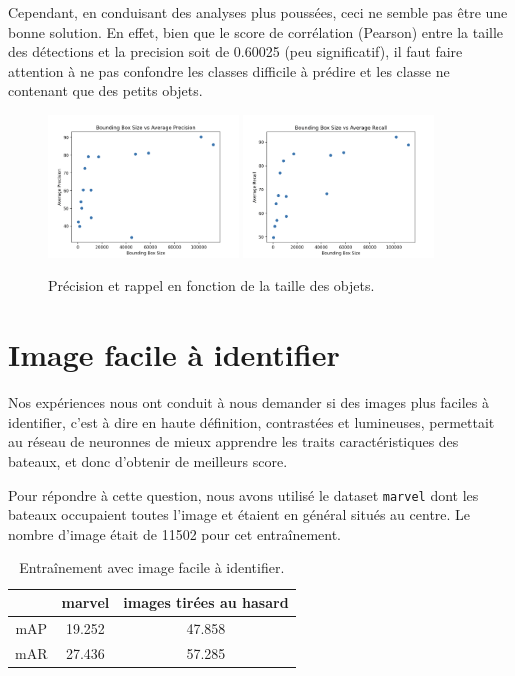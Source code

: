 Cependant, en conduisant des analyses plus poussées, ceci ne semble pas être une bonne solution.
En effet, bien que le score de corrélation  (Pearson) entre la taille des détections et la precision
soit de 0.60025 (peu significatif), il faut faire attention à ne pas confondre les classes
difficile à prédire et les classe ne contenant que des petits objets.

\begin{figure}[H]
    \centering
    \includegraphics[width=0.45\textwidth]{./img/size_precision.png}
    \includegraphics[width=0.45\textwidth]{./img/size_recall.png}
    \caption{Précision et rappel en fonction de la taille des objets.}
\end{figure}

\section{Image facile à identifier}

Nos expériences nous ont conduit à nous demander si des images plus faciles à identifier, c'est à dire
en haute définition, contrastées et lumineuses, permettait au réseau de neuronnes de mieux apprendre les
traits caractéristiques des bateaux, et donc d'obtenir de meilleurs score.

Pour répondre à cette question, nous avons utilisé le dataset \texttt{marvel} dont les bateaux occupaient
toutes l'image et étaient en général situés au centre. Le nombre d'image était de 11502 pour cet entraînement. \\

\begin{table}[H]
    \begin{center}
        \begin{tabular}{c c c}
            \hline
            & marvel & images tirées au hasard\\
            \hline
            mAP & 19.252 & 47.858 \\
            mAR & 27.436 & 57.285 \\
        \end{tabular}
    \end{center}
    \caption{Entraînement avec image facile à identifier.}
\end{table}

